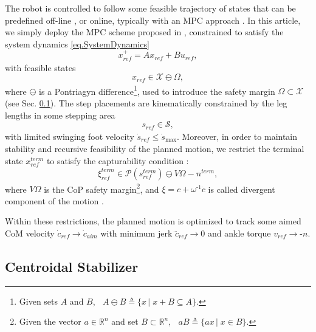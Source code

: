 \documentclass[letterpaper, 10 pt, conference]{ieeeconf}  %
\begin{document}
The robot is controlled to follow some feasible trajectory of states that can be predefined off-line \cite{Choi, Song2015_CharacterReference}, or online, typically with an MPC approach \cite{Mayne2000constrained, Herdt2010online, Wieber2006}.
%
In this article, we simply deploy the MPC scheme proposed in \cite{Herdt2010online}, constrained to satisfy the system dynamics \eqref{eq.SystemDynamics}
%
\begin{equation}\label{eq.ReferenceTrajectory}
    x_\mathit{ref}^{+} = Ax_\mathit{ref} + Bu_\mathit{ref}, 
\end{equation}
%
with feasible states
%
\begin{equation}\label{eq. ReferenceStateConstraint}
    x_\mathit{ref} \in \mathcal{X} \ominus \Omega,
\end{equation}
%
where $\ominus$ is a Pontriagyn difference\footnote{Given sets $A$ and $B$, $\;\;A\ominus B \triangleq \lbrace x \,|\; x + B \subseteq A\rbrace$.}, used to introduce the safety margin $\Omega\subset\mathcal{X}$ (see Sec. \ref{Sec.Stabilizer}).
The step placements are kinematically constrained by the leg lengths in some stepping area
%
\begin{equation}
    s_\mathit{ref} \in \mathcal{S},
\end{equation}
%
with limited swinging foot velocity $\dot{s}_\mathit{ref} \leq \dot{s}_\mathrm{max}$. Moreover, in order to maintain stability and recursive feasibility of the planned motion, we restrict the terminal state $x_\mathit{ref}^\mathit{term}$ to satisfy the capturability condition \cite{SherikovThese}:
%
\begin{equation}
    \xi_\mathit{ref}^\mathit{term}\in \mathcal{P}(s^\mathit{term}_\mathit{ref})\ominus V\Omega - n^\mathit{term},
\end{equation}
%
where $V\Omega$ is the CoP safety margin\footnote{Given the vector $a\in\mathbb{R}^n$ and set $B\subset\mathbb{R}^n$, $\;\;aB \triangleq \lbrace a x \,|\; x \in B\rbrace$.}, and $\xi =  c + \omega^{\texttt{-}1}\dot{c} $ is called divergent component of the motion \cite{Handbook}.

Within these restrictions, the planned motion is optimized to track some aimed CoM velocity $ \dot{c}_\mathit{ref}\! \rightarrow\! \dot{c}_\mathit{aim} $ with minimum jerk $\dddot{c}_\mathit{\!ref} \rightarrow 0 $ and ankle torque $v_\mathit{ref}\rightarrow  \texttt{-} n$. 

\subsection{Centroidal Stabilizer}\label{Sec.Stabilizer}
\end{document}

